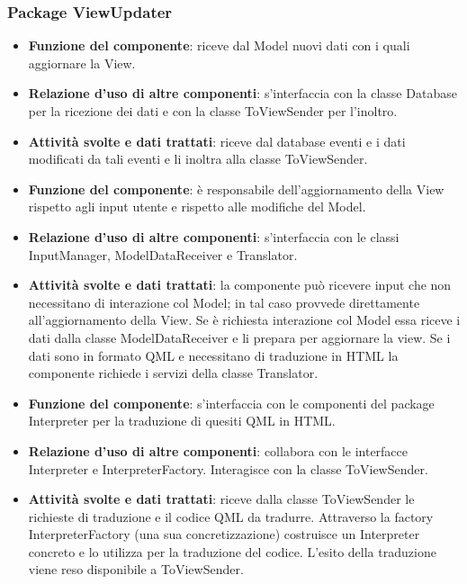 \documentclass[a4paper,11pt]{article}
\begin{document}
			\subsubsection{Package ViewUpdater}
			\begin{itemize}
				\item\textbf{Funzione del componente}: riceve dal Model nuovi dati  con i quali aggiornare la View.
				\item\textbf{Relazione d'uso di altre componenti}: s'interfaccia con la classe Database per la ricezione dei dati e con la classe ToViewSender per l'inoltro.
				\item\textbf{Attività svolte e dati trattati}: riceve dal database  eventi e i dati modificati da tali eventi e li inoltra alla classe ToViewSender. 
			\end{itemize}
			\begin{itemize}
				\item\textbf{Funzione del componente}: è responsabile dell'aggiornamento della View rispetto agli input utente e rispetto alle modifiche del Model.
				\item\textbf{Relazione d'uso di altre componenti}: s'interfaccia con le classi InputManager, ModelDataReceiver e Translator.
				\item\textbf{Attività svolte e dati trattati}: la componente può ricevere input che non necessitano di interazione col Model; in tal caso provvede direttamente all'aggiornamento della View. Se è richiesta interazione col Model essa riceve i dati dalla classe ModelDataReceiver e li prepara per aggiornare la view. Se i dati sono in formato QML e necessitano di traduzione in HTML la componente richiede i servizi della classe Translator.
			\end{itemize}
			\begin{itemize}
				\item\textbf{Funzione del componente}: s'interfaccia con le componenti del package Interpreter per la traduzione di quesiti QML in HTML.
				\item\textbf{Relazione d'uso di altre componenti}: collabora con le interfacce Interpreter e InterpreterFactory. Interagisce con la classe ToViewSender.
				\item\textbf{Attività svolte e dati trattati}: riceve dalla classe ToViewSender le richieste di traduzione e il codice QML da tradurre. Attraverso la factory InterpreterFactory (una sua concretizzazione) costruisce un Interpreter concreto e lo utilizza per la traduzione del codice. L'esito della traduzione viene reso disponibile a ToViewSender.
			\end{itemize}
\end{document}
